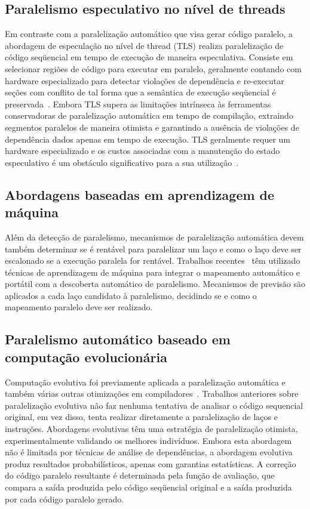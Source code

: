 \documentclass[a4paper,12pt]{article}
\begin{document}
\subsection{Paralelismo especulativo no nível de threads}

Em contraste com a paralelização automático que visa gerar código paralelo, a abordagem de especulação no nível de thread (TLS) realiza paralelização de código seqüencial em tempo de execução de maneira especulativa. Consiste em selecionar regiões de código para executar em paralelo, geralmente contando com hardware especializado para detectar violações de dependência e re-executar seções com conflito de tal forma que a semântica de execução seqüencial é preservada~\cite{hammond98,chen03,wu08}. Embora TLS supera as limitações intrínseca às ferramentas conservadoras de paralelização automática em tempo de compilação, extraindo segmentos paralelos de maneira otimista e garantindo a ausência de violações de dependência dados apenas em tempo de execução. TLS geralmente requer um hardware especializado e os custos associadas com a manutenção do estado especulativo é um obstáculo significativo para a sua utilização~\cite{yiapanis13}.

\subsection{Abordagens baseadas em aprendizagem de máquina}

Além da detecção de paralelismo, mecanismos de paralelização automática devem também determinar se é rentável para paralelizar um laço e como o laço deve ser escalonado se a execução paralela for rentável. Trabalhos recentes~\cite{wang09,tournavitis09,wang14a} têm utilizado técnicas de aprendizagem de máquina para integrar o mapeamento automático e portátil com a descoberta automático de paralelismo. Mecanismos de previsão são aplicados a cada laço candidato à paralelismo, decidindo se e como o mapeamento paralelo deve ser realizado.

\subsection{Paralelismo automático baseado em computação evolucionária}

Computação evolutiva foi previamente aplicada a paralelização automática e também várias outras otimizações em compiladores~\cite{walsh95,walsh96,williams96,williams99,schulte14a}. Trabalhos anteriores sobre paralelização evolutiva não faz nenhuma tentativa de analisar o código sequencial original, em vez disso, tenta realizar diretamente a paralelização de laços e instruções. Abordagens evolutivas têm uma estratégia de paralelização otimista, experimentalmente validando os melhores indivíduos. Embora esta abordagem não é limitada por técnicas de análise de dependências, a abordagem evolutiva produz resultados probabilísticos, apenas com garantias estatísticas. A correção do código paralelo resultante é determinada pela função de avaliação, que compara a saída produzida pelo código seqüencial original e a saída produzida por cada código paralelo gerado.
\end{document}
